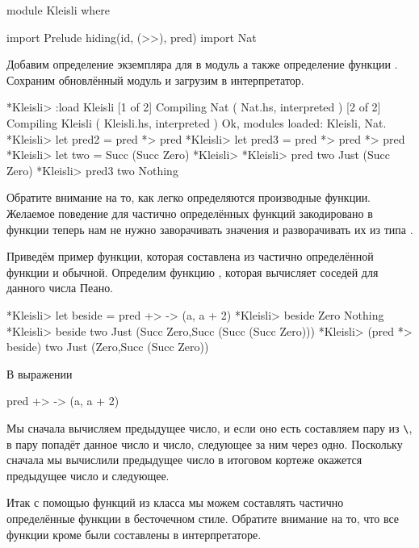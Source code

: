 \begin{code}
module Kleisli where
    
import Prelude hiding(id, (>>), pred)
import Nat
\end{code}

Добавим определение экземпляра  для  
в модуль  а также определение функции .
Сохраним обновлённый модуль и загрузим в интерпретатор. 

\begin{code}
*Kleisli> :load Kleisli
[1 of 2] Compiling Nat              ( Nat.hs, interpreted )
[2 of 2] Compiling Kleisli          ( Kleisli.hs, interpreted )
Ok, modules loaded: Kleisli, Nat.
*Kleisli> let pred2 = pred *> pred
*Kleisli> let pred3 = pred *> pred *> pred
*Kleisli> let two   = Succ (Succ Zero)
*Kleisli> 
*Kleisli> pred two
Just (Succ Zero)
*Kleisli> pred3 two
Nothing
\end{code}

Обратите внимание на то, как легко определяются
производные функции. Желаемое поведение для частично
определённых функций закодировано в функции \In{(*>)}
теперь нам не нужно заворачивать значения и разворачивать
их из типа .

Приведём пример функции, которая составлена из частично
определённой функции и обычной. Определим функцию
, которая вычисляет соседей для данного числа Пеано.

\begin{code}
*Kleisli> let beside = pred +> \a -> (a, a + 2)
*Kleisli> beside Zero
Nothing
*Kleisli> beside two
Just (Succ Zero,Succ (Succ (Succ Zero)))
*Kleisli> (pred *> beside) two
Just (Zero,Succ (Succ Zero))
\end{code}

В выражении 

\begin{code}
pred +> \a -> (a, a + 2)
\end{code}

Мы сначала вычисляем предыдущее число, и если оно есть
составляем пару из \verb!\!, в пару попадёт 
данное число и число, следующее за ним через одно. Поскольку сначала
мы вычислили предыдущее число в итоговом кортеже окажется
предыдущее число и следующее. 

Итак с помощью функций из класса 
мы можем составлять частично определённые функции 
в бесточечном стиле. Обратите внимание на то, что
все функции кроме  были составлены в интерпретаторе.

